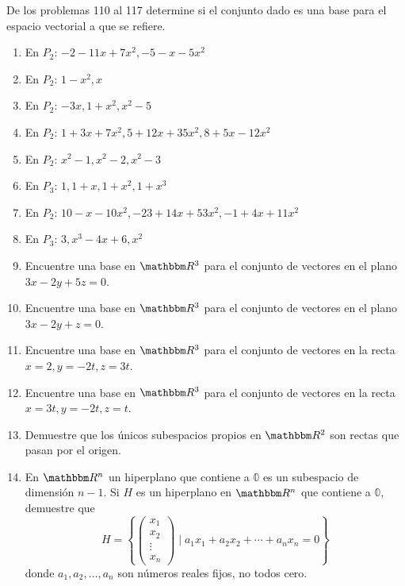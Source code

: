 De los problemas 110 al 117 determine si el conjunto dado es una base para el espacio vectorial a que se refiere.
\begin{enumerate}[resume]
    \item En $P_{2}$: $-2-11 x+7 x^{2},-5-x-5 x^{2}$
    \item En $P_{2}$: $1-x^{2}, x$
    \item En $P_{2}$: $-3 x, 1+x^{2}, x^{2}-5$
    \item En $P_{2}$: $1+3 x+7 x^{2}, 5+12 x+35 x^{2}, 8+5 x-12 x^{2}$
    \item En $P_{2}$: $x^{2}-1, x^{2}-2, x^{2}-3$
    \item En $P_{3}$: $1,1+x, 1+x^{2}, 1+x^{3}$
    \item En $P_{2}$: $10-x-10 x^{2},-23+14 x+53 x^{2},-1+4 x+11 x^{2}$
    \item En $P_{3}$: $3, x^{3}-4 x+6, x^{2}$
    \item Encuentre una base en $\RR[3]$ para el conjunto de vectores en el plano $3 x-2 y+5 z=0$.
    \item Encuentre una base en $\RR[3]$ para el conjunto de vectores en el plano $3 x-2 y+z=0$.
    \item Encuentre una base en $\RR[3]$ para el conjunto de vectores en la recta $x=2, y=-2 t, z=3 t$.
    \item Encuentre una base en $\RR[3]$ para el conjunto de vectores en la recta $x=3 t, y=-2 t, z=t$.
    \item Demuestre que los únicos subespacios propios en $\RR[2]$ son rectas que pasan por el origen.
    \item En $\RR[n]$ un hiperplano que contiene a $\mathbb{0}$ es un subespacio de dimensión $n-1$. Si $H$ es un hiperplano en $\RR[n]$ que contiene a $\mathbb{0}$, demuestre que
    $$H=\left\{ \begin{pmatrix} x_1 \\ x_2 \\ \vdots \\ x_n \end{pmatrix} \mid a_{1} x_{1}+a_{2} x_{2}+\cdots+a_{n} x_{n}=0\right\}$$
    donde $a_{1}, a_{2}, \dots, a_{n}$ son números reales fijos, no todos cero.
\end{enumerate}
